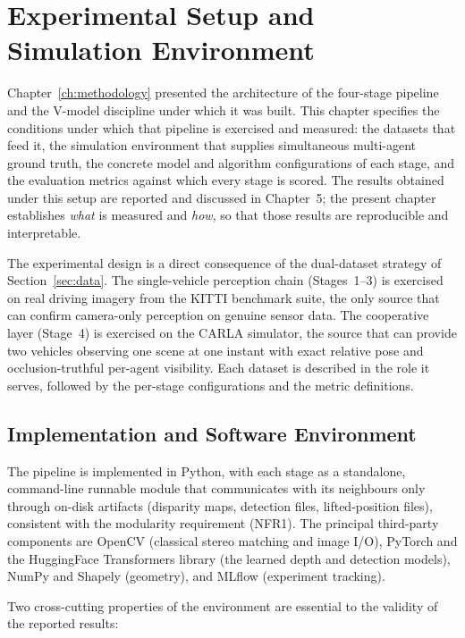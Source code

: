 \chapter{Experimental Setup and Simulation Environment}
\label{ch:experimental}

Chapter~\ref{ch:methodology} presented the architecture of the four-stage pipeline
and the V-model discipline under which it was built. This chapter specifies the
conditions under which that pipeline is exercised and measured: the datasets that
feed it, the simulation environment that supplies simultaneous multi-agent ground
truth, the concrete model and algorithm configurations of each stage, and the
evaluation metrics against which every stage is scored. The results obtained under
this setup are reported and discussed in Chapter~5; the present chapter establishes
\emph{what} is measured and \emph{how}, so that those results are reproducible and
interpretable.

The experimental design is a direct consequence of the dual-dataset strategy of
Section~\ref{sec:data}. The single-vehicle perception chain (Stages~1--3) is
exercised on real driving imagery from the KITTI benchmark suite, the only source
that can confirm camera-only perception on genuine sensor data. The cooperative
layer (Stage~4) is exercised on the CARLA simulator, the source that can provide
two vehicles observing one scene at one instant with exact relative pose and
occlusion-truthful per-agent visibility. Each dataset is described in the role it
serves, followed by the per-stage configurations and the metric definitions.

\section{Implementation and Software Environment}
\label{sec:environment}

The pipeline is implemented in Python, with each stage as a standalone, command-line
runnable module that communicates with its neighbours only through on-disk artifacts
(disparity maps, detection files, lifted-position files), consistent with the
modularity requirement (NFR1). The principal third-party components are OpenCV
(classical stereo matching and image I/O), PyTorch and the HuggingFace Transformers
library (the learned depth and detection models), NumPy and Shapely (geometry), and
MLflow (experiment tracking).

Two cross-cutting properties of the environment are essential to the validity of the
reported results:

